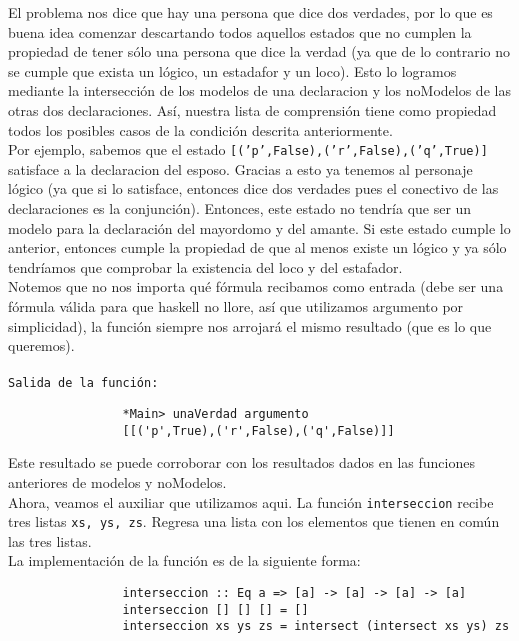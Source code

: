 \documentclass[letterpaper,12pt]{article}
\begin{document}
\begin{itemize}
\begin{itemize}
            El problema nos dice que hay una persona que dice dos verdades, 
            por lo que es buena idea comenzar descartando todos aquellos 
            estados que no cumplen la propiedad de tener sólo una persona 
            que dice la verdad (ya que de lo contrario no se cumple que 
            exista un lógico, un estadafor y un loco). Esto lo logramos 
            mediante la intersección de los modelos de una declaracion y los
            noModelos de las otras dos declaraciones. Así, nuestra lista de 
            comprensión tiene como propiedad todos los posibles casos de la 
            condición descrita anteriormente.\\
            Por ejemplo, sabemos que el estado 
            \texttt{[('p',False),('r',False),('q',True)]} satisface a la 
            declaracion del esposo. Gracias a esto ya tenemos al personaje 
            lógico (ya que si lo satisface, entonces dice dos verdades pues
            el conectivo de las declaraciones es la conjunción). Entonces, 
            este estado no tendría que ser un modelo para la declaración del
            mayordomo y del amante. Si este estado cumple lo anterior, 
            entonces cumple la propiedad de que al menos existe un lógico y
            ya sólo tendríamos que comprobar la existencia del loco y del 
            estafador. \\
            Notemos que no nos importa qué fórmula recibamos como entrada 
            (debe ser una fórmula válida para que haskell no llore, así que 
            utilizamos argumento por simplicidad), la función siempre nos 
            arrojará el mismo resultado (que es lo que queremos). \\ \\
            \texttt{Salida de la función:}
            \begin{lstlisting}
                *Main> unaVerdad argumento
                [[('p',True),('r',False),('q',False)]]
            \end{lstlisting}

            Este resultado se puede corroborar con los resultados dados en 
            las funciones anteriores de modelos y noModelos. \\
            Ahora, veamos el auxiliar que utilizamos aqui. La función 
            \texttt{interseccion} recibe tres listas \texttt{xs, ys, zs}. 
            Regresa una lista con los elementos que tienen en común las tres
            listas. \\
            La implementación de la función es de la siguiente forma:
            \begin{lstlisting}
                interseccion :: Eq a => [a] -> [a] -> [a] -> [a]
                interseccion [] [] [] = [] 
                interseccion xs ys zs = intersect (intersect xs ys) zs
            \end{lstlisting}


\end{itemize}
\end{itemize}
\end{document}
